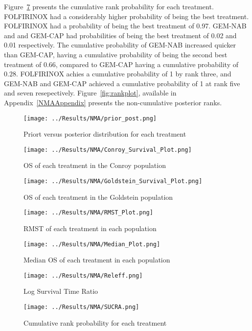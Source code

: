 Figure~\ref{fig:sucra} presents the cumulative rank probability for each treatment. FOLFIRINOX had a considerably higher probability of being the best treatment. FOLFIRINOX had a probability of being the best treatment of 0.97. GEM-NAB and and GEM-CAP had probabilities of being the best treatment of 0.02 and 0.01 respectively. The cumulative probability of GEM-NAB increased quicker than GEM-CAP, having a cumulative probability of being the second best treatment of 0.66, compared to GEM-CAP having a cumulative probability of $0.28$. FOLFIRINOX achies a cumulative probability of 1 by rank three, and GEM-NAB and GEM-CAP achieved a cumulative probability of 1 at rank five and seven resepectively. Figure~\ref{fig:rankplot}, available in Appendix~\ref{NMAAppendix} presents the non-cumulative posterior ranks. 

\begin{figure}[h]
    \centering
    \texttt{[image: ../Results/NMA/prior\_post.png]}
    \caption{Priort versus posterior distribution for each treatment}
    \label{fig:prior_post}
\end{figure}


\begin{figure}[h]
    \centering
    \texttt{[image: ../Results/NMA/Conroy\_Survival\_Plot.png]}
    \caption{OS of each treatment in the Conroy population}
    \label{fig:pred_survbc_conroy}
\end{figure}

\begin{figure}[h]
    \centering
    \texttt{[image: ../Results/NMA/Goldstein\_Survival\_Plot.png]}
    \caption{OS of each treatment in the Goldstein population}
    \label{fig:pred_survbc_goldstein}
\end{figure}

\begin{figure}[h]
    \centering
    \texttt{[image: ../Results/NMA/RMST\_Plot.png]}
    \caption{RMST of each treatment in each population}
    \label{fig:pred_rmstbc}
\end{figure}

\begin{figure}[h]
    \centering
    \texttt{[image: ../Results/NMA/Median\_Plot.png]}
    \caption{Median OS of each treatment in each population}
    \label{fig:pred_medianbc}
\end{figure}

\begin{figure}[h]
    \centering
    \texttt{[image: ../Results/NMA/Releff.png]}
    \caption{Log Survival Time Ratio}
    \label{fig:releff}
\end{figure}

\begin{figure}[h]
    \centering
    \texttt{[image: ../Results/NMA/SUCRA.png]}
    \caption{Cumulative rank probability for each treatment}
    \label{fig:sucra}
\end{figure}